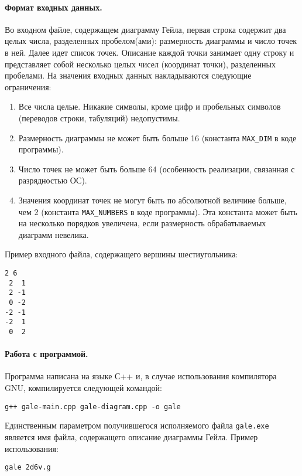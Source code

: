 \documentclass[12pt]{article}
\begin{document}
\paragraph{Формат входных данных.}
Во входном файле, содержащем диаграмму Гейла, первая строка содержит два целых числа, разделенных пробелом(ами): размерность диаграммы и число точек в ней. Далее идет список точек. Описание каждой точки занимает одну строку и представляет собой несколько целых чисел (координат точки), разделенных пробелами. На значения входных данных накладываются следующие ограничения:
\begin{enumerate}
	\item Все числа целые. Никакие символы, кроме цифр и пробельных символов (переводов строки, табуляций) недопустимы.
	\item Размерность диаграммы не может быть больше 16 (константа \texttt{MAX\_DIM} в коде программы).
	\item Число точек не может быть больше 64 (особенность реализации, связанная с разрядностью ОС).
	\item Значения координат точек не могут быть по абсолютной величине больше, чем 2 (константа \texttt{MAX\_NUMBERS} в коде программы). Эта константа может быть на несколько порядков увеличена, если размерность обрабатываемых диаграмм невелика.
\end{enumerate}
Пример входного файла, содержащего вершины шестиугольника:
\begin{verbatim}
2 6
 2  1
 2 -1
 0 -2
-2 -1
-2  1
 0  2
\end{verbatim}

\paragraph{Работа с программой.}
Программа написана на языке С++ и, в случае использования компилятора GNU, компилируется следующей командой:
\begin{verbatim}
g++ gale-main.cpp gale-diagram.cpp -o gale
\end{verbatim}
Единственным параметром получившегося исполняемого файла \texttt{gale.exe} является имя файла, содержащего описание диаграммы Гейла. Пример использования:
\begin{verbatim}
gale 2d6v.g
\end{verbatim}
\end{document}
